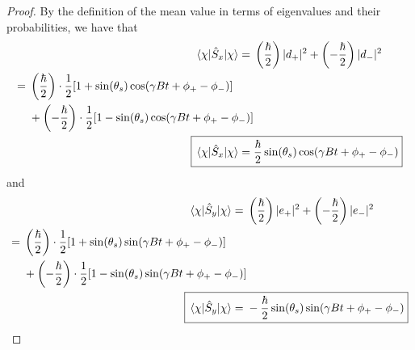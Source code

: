 \documentclass[../psets.tex]{subfiles}
\begin{document}
\begin{enumerate}
\begin{enumerate}
\begin{proof}
            By the definition of the mean value in terms of eigenvalues and their probabilities, we have that
            \begin{align*}
                \ev{\hat{S}_x}{\chi} ={}& \left( \frac{\hbar}{2} \right)|d_+|^2+\left( -\frac{\hbar}{2} \right)|d_-|^2\\
                \begin{split}
                    ={}& \left( \frac{\hbar}{2} \right)\cdot\frac{1}{2}[1+\sin(\theta_s)\cos(\gamma Bt+\phi_+-\phi_-)]\\
                    & +\left( -\frac{\hbar}{2} \right)\cdot\frac{1}{2}[1-\sin(\theta_s)\cos(\gamma Bt+\phi_+-\phi_-)]
                \end{split}\\
                \Aboxed{\ev{\hat{S}_x}{\chi} ={}& \frac{\hbar}{2}\sin(\theta_s)\cos(\gamma Bt+\phi_+-\phi_-)}
            \end{align*}
            and
            \begin{align*}
                \ev{\hat{S}_y}{\chi} ={}& \left( \frac{\hbar}{2} \right)|e_+|^2+\left( -\frac{\hbar}{2} \right)|e_-|^2\\
                \begin{split}
                    ={}& \left( \frac{\hbar}{2} \right)\cdot\frac{1}{2}[1+\sin(\theta_s)\sin(\gamma Bt+\phi_+-\phi_-)]\\
                    & +\left( -\frac{\hbar}{2} \right)\cdot\frac{1}{2}[1-\sin(\theta_s)\sin(\gamma Bt+\phi_+-\phi_-)]
                \end{split}\\
                \Aboxed{\ev{\hat{S}_y}{\chi} ={}& -\frac{\hbar}{2}\sin(\theta_s)\sin(\gamma Bt+\phi_+-\phi_-)}
            \end{align*}
        \end{proof}
    \end{enumerate}
\end{enumerate}
\end{document}
